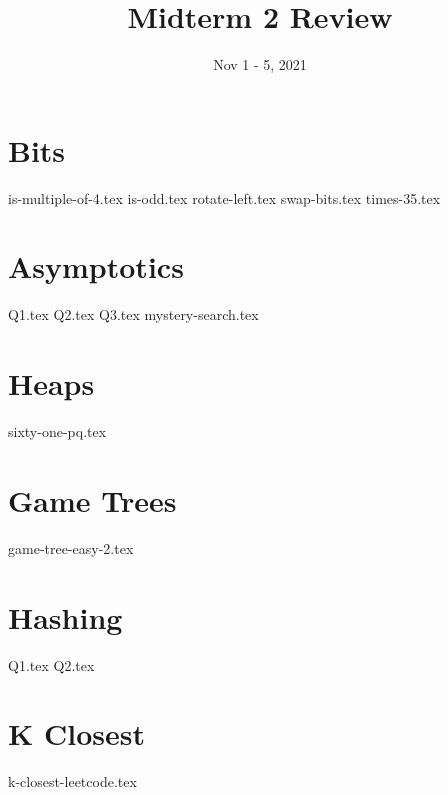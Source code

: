 \documentclass[11pt]{exam}
\title{Midterm 2 Review}
\date{Nov 1 - 5, 2021}
\begin{document}
\maketitle

\section{Bits}
\begin{questions}
{is-multiple-of-4.tex}
{is-odd.tex}
{rotate-left.tex}
{swap-bits.tex}
{times-35.tex}

\end{questions}
\clearpage

\section{Asymptotics}
\begin{questions}
{Q1.tex}
{Q2.tex}
\newpage
{Q3.tex}
{mystery-search.tex}

\end{questions}
\clearpage

\section{Heaps}
\begin{questions}
{sixty-one-pq.tex}

\end{questions}
\clearpage

\section{Game Trees}
\begin{questions}
{game-tree-easy-2.tex}

\end{questions}
\clearpage

\section{Hashing}
\begin{questions}
{Q1.tex}
{Q2.tex}

\end{questions}
\clearpage

\section{K Closest}
\begin{questions}
{k-closest-leetcode.tex}
\end{questions}
\clearpage




\clearpage
\end{document}
